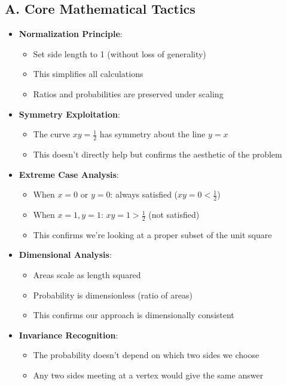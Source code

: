 \documentclass[11pt]{article}
\begin{document}
\begin{tacticalbox}
\subsection*{A. Core Mathematical Tactics}
\begin{itemize}[leftmargin=*]
    \item \textbf{Normalization Principle}: 
    \begin{itemize}
        \item Set side length to 1 (without loss of generality)
        \item This simplifies all calculations
        \item Ratios and probabilities are preserved under scaling
    \end{itemize}
    
    \item \textbf{Symmetry Exploitation}: 
    \begin{itemize}
        \item The curve $xy = \frac{1}{2}$ has symmetry about the line $y = x$
        \item This doesn't directly help but confirms the aesthetic of the problem
    \end{itemize}
    
    \item \textbf{Extreme Case Analysis}: 
    \begin{itemize}
        \item When $x = 0$ or $y = 0$: always satisfied ($xy = 0 < \frac{1}{2}$)
        \item When $x = 1, y = 1$: $xy = 1 > \frac{1}{2}$ (not satisfied)
        \item This confirms we're looking at a proper subset of the unit square
    \end{itemize}
    
    \item \textbf{Dimensional Analysis}: 
    \begin{itemize}
        \item Areas scale as length squared
        \item Probability is dimensionless (ratio of areas)
        \item This confirms our approach is dimensionally consistent
    \end{itemize}
    
    \item \textbf{Invariance Recognition}: 
    \begin{itemize}
        \item The probability doesn't depend on which two sides we choose
        \item Any two sides meeting at a vertex would give the same answer
    \end{itemize}
\end{itemize}


\end{tacticalbox}
\end{document}
